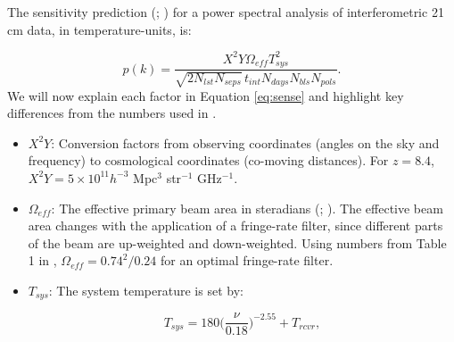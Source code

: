 \documentclass[preprint2,numberedappendix,tighten]{aastex6}  %
\begin{document}
The sensitivity prediction (\citealt{parsons_et_al2012a}; \citealt{pober_et_al2013}) for a power spectral analysis of 
interferometric 21\,cm data, in temperature-units, is:

\begin{equation}
\label{eq:sense}
p(k) = \frac{X^{2}Y \Omega_{eff} T_{sys}^{2}}{\sqrt{2N_{lst}N_{seps}}\,t_{int}N_{days}N_{bls}N_{pols}}.
\end{equation}
We will now explain each factor in Equation \eqref{eq:sense} and highlight key differences from the numbers used in .

\begin{itemize}
\item $X^{2}Y$: Conversion factors from observing coordinates (angles on the sky and frequency) to cosmological coordinates (co-moving 
distances). For $z=8.4$, $X^{2}Y = 5 \times 10^{11} h^{-3}$ Mpc$^{3}$ str$^{-1}$ GHz$^{-1}$.
\item $\Omega_{eff}$: The effective primary beam area in steradians (\citealt{parsons_et_al2010}; \citealt{pober_et_al2012}). 
The effective beam area changes with the application of a fringe-rate filter, since different parts of the beam are up-weighted and down-weighted. Using numbers from Table 1 in \citet{parsons_et_al2016}, $\Omega_{eff} = 0.74^{2}/0.24$ for an optimal fringe-rate 
filter. 
\item $T_{sys}$: The system temperature is set by:

\begin{equation}
\label{eq:sys}
T_{sys} = 180\Big(\frac{\nu}{0.18}\Big)^{-2.55} + T_{rcvr},
\end{equation}


\end{itemize}
\end{document}
